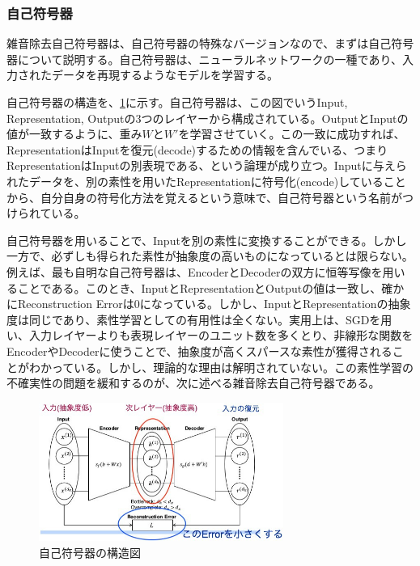 \subsubsection{自己符号器}
雑音除去自己符号器は、自己符号器の特殊なバージョンなので、まずは自己符号器について説明する。自己符号器は、ニューラルネットワークの一種であり、入力されたデータを再現するようなモデルを学習する。\cite{bourlard1988auto, hinton1994autoencoders, schwenk1995transformation}\par
自己符号器の構造を、\ref{c3_自己符号器}に示す。自己符号器は、この図でいうInput, Representation, Outputの3つのレイヤーから構成されている。OutputとInputの値が一致するように、重み$W$と$W'$を学習させていく。この一致に成功すれば、RepresentationはInputを復元(decode)するための情報を含んでいる、つまりRepresentationはInputの別表現である、という論理が成り立つ。Inputに与えられたデータを、別の素性を用いたRepresentationに符号化(encode)していることから、自分自身の符号化方法を覚えるという意味で、自己符号器という名前がつけられている。\par
自己符号器を用いることで、Inputを別の素性に変換することができる。しかし一方で、必ずしも得られた素性が抽象度の高いものになっているとは限らない。例えば、最も自明な自己符号器は、EncoderとDecoderの双方に恒等写像を用いることである。このとき、InputとRepresentationとOutputの値は一致し、確かにReconstruction Errorは0になっている。しかし、InputとRepresentationの抽象度は同じであり、素性学習としての有用性は全くない。実用上は、SGDを用い、入力レイヤーよりも表現レイヤーのユニット数を多くとり、非線形な関数をEncoderやDecoderに使うことで、抽象度が高くスパースな素性が獲得されることがわかっている\cite{bengio2007greedy}\cite{lee2007sparse}。しかし、理論的な理由は解明されていない。この素性学習の不確実性の問題を緩和するのが、次に述べる雑音除去自己符号器である。
\begin{figure}[tbp]
 \begin{center}
  \includegraphics[width=80mm]{img/c3/autoencoder}
 \end{center}
 \caption{自己符号器の構造図}
 \label{c3_自己符号器}
\end{figure}

